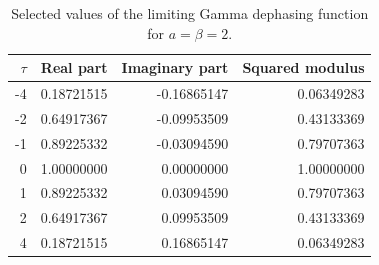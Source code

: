 \begin{table}[H]
\centering
\caption{Selected values of the limiting Gamma dephasing function for $a=\beta=2$.}
\begin{tabular}{rrrr}
\toprule $\tau$ & Real part & Imaginary part & Squared modulus \\ \midrule
-4 & 0.18721515 & -0.16865147 & 0.06349283 \\
-2 & 0.64917367 & -0.09953509 & 0.43133369 \\
-1 & 0.89225332 & -0.03094590 & 0.79707363 \\
0 & 1.00000000 & 0.00000000 & 1.00000000 \\
1 & 0.89225332 & 0.03094590 & 0.79707363 \\
2 & 0.64917367 & 0.09953509 & 0.43133369 \\
4 & 0.18721515 & 0.16865147 & 0.06349283 \\
\bottomrule
\end{tabular}
\end{table}
